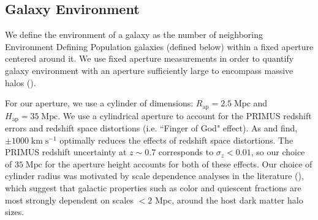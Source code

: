 \documentclass{emulateapj}
\def \apradius{2.5}
\def \apheight{35}
\begin{document}
\subsection{Galaxy Environment} \label{sec:environment}
We define the environment of a galaxy as the number of neighboring Environment Defining Population galaxies (defined below) within a fixed aperture centered around it. We use fixed aperture measurements in order to quantify galaxy environment with an aperture sufficiently large to encompass massive halos (\citealt{Muldrew:2012aa, Skibba:2013aa}).

For our aperture, we use a cylinder of dimensions: $R_{\mathrm{ap}} =
\apradius\;
\mathrm{Mpc}$ and $H_{\mathrm{ap}} = \apheight\; \mathrm{Mpc}$.  We use a
cylindrical aperture to account for the PRIMUS redshift
errors and redshift space distortions (i.e. ``Finger of God"
effect). As \cite{Cooper:2005aa} and \cite{Gallazzi:2009aa} find, 
$\pm 1000 \; \mathrm{km} \;\mathrm{s^{-1}}$ optimally reduces the effects of redshift space
distortions. The PRIMUS redshift uncertainty at $z \sim 0.7$
corresponds to $\sigma_z < 0.01$, so our choice of $\apheight\;
\mathrm{Mpc}$ for the aperture height accounts for both of these effects. Our choice of
cylinder radius was motivated by scale dependence analyses in the
literature (\citealt{Blanton:2006aa, Wilman:2010aa, Muldrew:2012aa}),
which suggest that galactic properties such as color and quiescent
fractions are most strongly dependent on scales $< 2$ Mpc, around the
host dark matter halo sizes.


\end{document}
